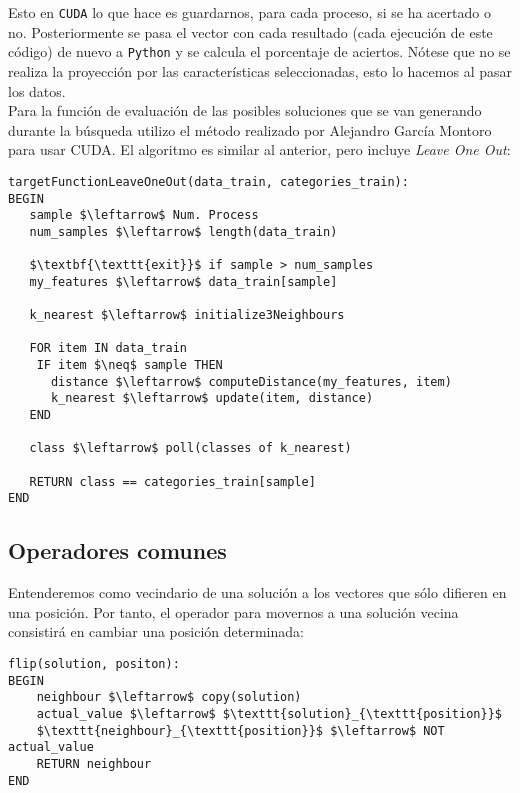 \documentclass[11pt,leqno]{article}
\begin{document}
	Esto en \texttt{CUDA} lo que hace es guardarnos, para cada proceso, si se ha acertado o no. Posteriormente se pasa el vector con cada resultado (cada ejecución de este código) de nuevo a \texttt{Python} y se calcula el porcentaje de aciertos. Nótese que no se realiza la proyección por las características seleccionadas, esto lo hacemos al pasar los datos.\\
	Para la función de evaluación de las posibles soluciones que se van generando durante la búsqueda utilizo el método realizado por Alejandro García Montoro para usar CUDA. El algoritmo es similar al anterior, pero incluye \textit{Leave One Out}:

\begin{lstlisting}[mathescape=true]
targetFunctionLeaveOneOut(data_train, categories_train):
BEGIN
   sample $\leftarrow$ Num. Process
   num_samples $\leftarrow$ length(data_train)
   
   $\textbf{\texttt{exit}}$ if sample > num_samples
   my_features $\leftarrow$ data_train[sample]
   
   k_nearest $\leftarrow$ initialize3Neighbours
	
   FOR item IN data_train
    IF item $\neq$ sample THEN
      distance $\leftarrow$ computeDistance(my_features, item)
      k_nearest $\leftarrow$ update(item, distance)
   END
	
   class $\leftarrow$ poll(classes of k_nearest)
      
   RETURN class == categories_train[sample]
END
\end{lstlisting}

\subsection{Operadores comunes}
	Entenderemos como vecindario de una solución a los vectores que sólo difieren en una posición. Por tanto, el operador para movernos a una solución vecina consistirá en cambiar una posición determinada:
\begin{lstlisting}[mathescape=true]
flip(solution, positon):
BEGIN
	neighbour $\leftarrow$ copy(solution)
	actual_value $\leftarrow$ $\texttt{solution}_{\texttt{position}}$
	$\texttt{neighbour}_{\texttt{position}}$ $\leftarrow$ NOT actual_value
	RETURN neighbour
END
\end{lstlisting}
	
\end{document}
